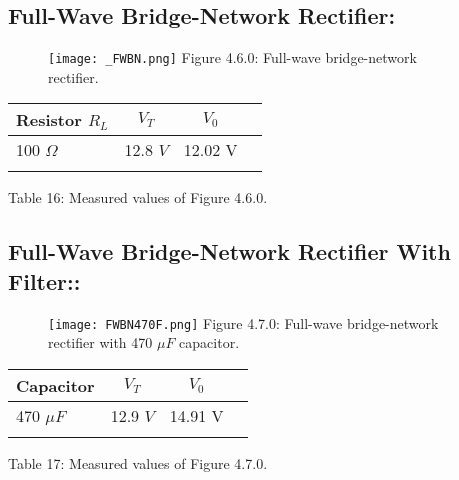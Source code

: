\subsection{Full-Wave Bridge-Network Rectifier:}

\begin{figure}[H]
\texttt{[image: \_FWBN.png]}
\centering \linebreak \linebreak Figure 4.6.0: Full-wave bridge-network rectifier.
\end{figure}

\begin{multicols}{2}
\begin{center}
\begin{tabular}[.5cm]{l c c c}
\toprule
Resistor $R_{L}$ & $V_{T}$ & $V_{0}$ \\
\midrule
100 $\Omega$ & 12.8 $V$ &  12.02 V \\
\bottomrule
\linebreak
\end{tabular}
\centering \linebreak Table 16: Measured values of Figure 4.6.0.
\end{center} \hfill

\end{multicols}

\pagebreak

\subsection{Full-Wave Bridge-Network Rectifier With Filter::}

\begin{figure}[H]
\texttt{[image: FWBN470F.png]}
\centering \linebreak \linebreak Figure 4.7.0: Full-wave bridge-network rectifier with 470 $\mu F$ capacitor.
\end{figure}

\begin{multicols}{2}
\begin{center}
\begin{tabular}[.5cm]{l c c c}
\toprule
Capacitor & $V_{T}$ & $V_{0}$ \\
\midrule
470 $\mu F$ & 12.9 $V$ &  14.91 V \\
\bottomrule
\linebreak
\end{tabular}
\centering \linebreak Table 17: Measured values of Figure 4.7.0.
\end{center} \hfill

\end{multicols}

